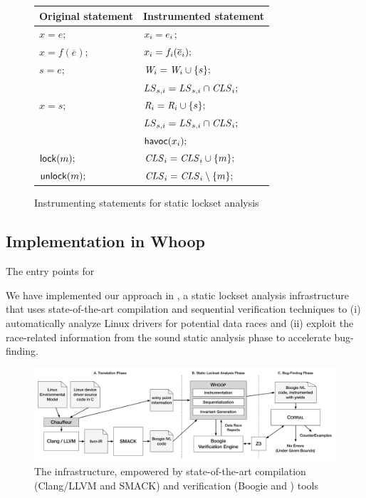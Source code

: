 \begin{figure}
\begin{tabular}{ll}
\textbf{Original statement} & \textbf{Instrumented statement} \\\hline
$x = e;$                & $x_{i} = e_{i}$;  \\\hline
$x = f(\overline{e});$ & $x_{i} = f_{i}(\overline{e}_{i});$ \\\hline
$s = e;$ & $\mathit{W}_{i} = \mathit{W}_{i} \cup \{ s \};$ \\
         & $\mathit{LS}_{s,i} = \mathit{LS}_{s,i} \cap \mathit{CLS}_{i};$ \\\hline
$x = s;$ & $\mathit{R}_{i} = \mathit{R}_{i} \cup \{ s \};$ \\
         & $\mathit{LS}_{s,i} = \mathit{LS}_{s,i} \cap \mathit{CLS}_{i};$ \\
         & $\mathsf{havoc}({x_{i}});$ \\\hline
$\mathsf{lock}(m);$   & $\mathit{CLS}_{i} = \mathit{CLS}_{i} \cup \{ m \};$ \\\hline
$\mathsf{unlock}(m);$ & $\mathit{CLS}_{i} = \mathit{CLS}_{i} \setminus \{ m \};$ \\\hline
\end{tabular}
\caption{Instrumenting statements for static lockset analysis}\label{fig:instrumentation}
\end{figure}







\subsection{Implementation in Whoop}\label{sec:whoopimplementation}





The entry points for 



We have implemented our approach in \whoop, a static lockset analysis infrastructure that uses state-of-the-art compilation and sequential verification techniques to (i) automatically analyze Linux drivers for potential data races and (ii) exploit the race-related information from the sound static analysis phase to accelerate bug-finding.

\begin{figure}
\centering
\includegraphics[width=.99\linewidth]{img/whoop.pdf}
\caption{The \whoop infrastructure, empowered by state-of-the-art compilation (Clang/LLVM and SMACK) and verification (Boogie and \corral) tools}
\label{fig:whoop}
\end{figure}

